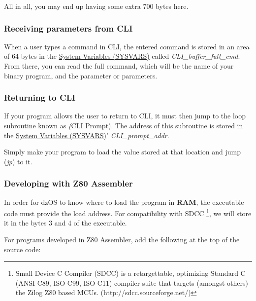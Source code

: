 \documentclass[a4paper,11pt]{article}
\begin{document}
    All in all, you may end up having some extra 700 bytes here.

    \subsubsection{Receiving parameters from CLI}
    When a user types a command in CLI, the entered command is stored in an area
    of 64 bytes in the \hyperref[sec:ram_memmap]{System Variables (SYSVARS)} 
    called \textit{CLI\_buffer\_full\_cmd}. From there, you can read the full
    command, which will be the name of your binary program, and the parameter or
    parameters.

    \subsubsection{Returning to CLI}

    If your program allows the user to return to CLI, it must then jump to the
    loop subroutine known as \textit(CLI Prompt). The address of this subroutine
    is stored in the \hyperref[sec:ram_memmap]{System Variables (SYSVARS)}'
    \textit{CLI\_prompt\_addr}.

    Simply make your program to load the value stored at that location and jump
    (\textit{jp}) to it.

    \subsubsection{Developing with Z80 Assembler}
    In order for dzOS to know where to load the program in \textbf{RAM}, the
    executable code must provide the load address. For compatibility with SDCC
    \footnote{Small Device C Compiler (SDCC) is a retargettable, optimizing
    Standard C (ANSI C89, ISO C99, ISO C11) compiler suite that targets (amongst
    others) the Zilog Z80 based MCUs. (http://sdcc.sourceforge.net/)}, we will
    store it in the bytes 3 and 4 of the executable.

    For programs developed in Z80 Assembler, add the following at the top of the
    source code:
\end{document}
